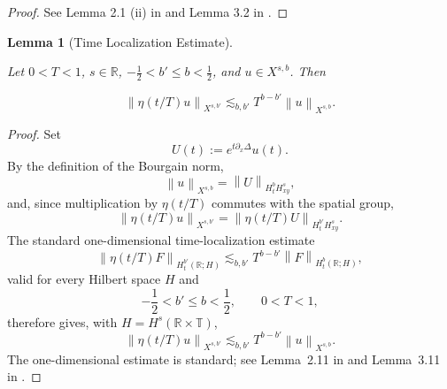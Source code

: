 \documentclass[12pt,oneside,reqno]{amsart}
\numberwithin{equation}{section}
\theoremstyle{plain}
\newtheorem{lemma}[theorem]{Lemma}
\def\R{{\mathbb R}}
\def\T{{\mathbb T}}
\newcommand{\norm}[1]{%
    \left\lVert #1\right\rVert%
}
\def\pt{\partial}
\newcommand{\xnorm}[3]{%
    \left\lVert #1\right\rVert_{X^{{#2},{#3}}}%
}
\newcommand{\rt}{\R\times\T}
\begin{document}
\begin{proof} 
See Lemma 2.1 (ii) in \cite{ginibre1997cauchy} and Lemma 3.2 in \cite{ginibre1995probleme}.
\end{proof}





\begin{lemma}[Time Localization Estimate]
\label{Lem:XbsLocalImbedding}

Let $0<T<1$, $s\in\R$, $-\frac12<b'\leq b<\frac12$, and
$u\in X^{s,b}$. Then

\begin{equation}
    \norm{\eta(t/T)u}_{X^{s,b'}} \lesssim_{b,b'} T^{b-b'} \norm{u}_{X^{s,b}}.
\end{equation}
    
\end{lemma}
\begin{proof}
Set
\begin{equation}
    U(t)
    :=
    e^{t\pt_x\Delta}u(t).
\end{equation}
By the definition of the Bourgain norm,
\begin{equation}
    \xnorm{u}{s}{b}
    =
    \norm{U}_{H_t^bH_{xy}^s},
\end{equation}
and, since multiplication by $\eta(t/T)$ commutes with the spatial
group,
\begin{equation}
    \xnorm{\eta(t/T)u}{s}{b'}
    =
    \norm{
        \eta(t/T)U
    }_{H_t^{b'}H_{xy}^s}.
\end{equation}
The standard one-dimensional time-localization estimate
\begin{equation}
    \norm{
        \eta(t/T)F
    }_{H_t^{b'}(\R;H)}
    \lesssim_{b,b'}
    T^{b-b'}
    \norm{F}_{H_t^b(\R;H)},
\end{equation}
valid for every Hilbert space $H$ and
\begin{equation}
    -\frac12<b'\leq b<\frac12,
    \qquad
    0<T<1,
\end{equation}
therefore gives, with $H=H^s(\rt)$,
\begin{equation}
    \xnorm{\eta(t/T)u}{s}{b'}
    \lesssim_{b,b'}
    T^{b-b'}
    \xnorm{u}{s}{b}.
\end{equation}
The one-dimensional estimate is standard; see
Lemma~2.11 in \cite{tao2006nonlinear} and
Lemma~3.11 in \cite{erdougan2016dispersive}.
\end{proof}
\end{document}
